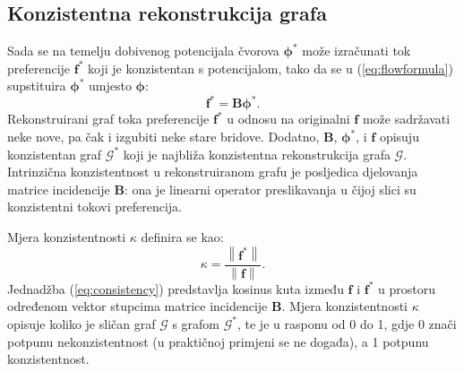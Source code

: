 \documentclass[lmodern, utf8, diplomski, numeric]{fer}
\newcommand{\matr}[1]{\mathbold{#1}}
\newcommand{\graph}[1]{\mathcal{#1}}
\newcommand{\q}{\left}
\newcommand{\w}{\right}
\begin{document}
  \subsection{Konzistentna rekonstrukcija grafa}
  \label{sec:reconstruct}
  Sada se na temelju dobivenog potencijala čvorova $\matr{\phi^*}$ može izračunati tok preferencije $\matr{f^*}$ koji je konzistentan s potencijalom, tako da se u (\ref{eq:flowformula}) supstituira $\matr{\phi^*}$ umjesto $\matr{\phi}$:
  \begin{equation}
  \matr{f^*} = \matr{B} \matr{\phi^*}.
  \end{equation}
  Rekonstruirani graf toka preferencije $\matr{f^*}$ u odnosu na originalni $\matr{f}$ može sadržavati neke nove, pa čak i izgubiti neke stare bridove.
  Dodatno, $\matr{B}$, $\matr{\phi^*}$, i $\matr{f}$ opisuju konzistentan graf $\graph{G}^*$ koji je najbliža konzistentna rekonstrukcija grafa $\graph{G}$.
  Intrinzična konzistentnost u rekonstruiranom grafu je posljedica djelovanja matrice incidencije $\matr B$: ona je linearni operator preslikavanja u čijoj slici su konzistentni tokovi preferencija.
  
  Mjera konzistentnosti $\kappa$ definira se kao:
  \begin{equation}
  \label{eq:consistency}
  \kappa = \frac{\q \lVert \matr{f^*} \w \rVert}{\q \lVert \matr{f} \w \rVert}.
  \end{equation}
  Jednadžba (\ref{eq:consistency}) predstavlja kosinus kuta između $\matr{f}$ i $\matr{f^*}$ u prostoru određenom vektor stupcima matrice incidencije $\matr{B}$.
  Mjera konzistentnosti $\kappa$ opisuje koliko je sličan graf $\graph{G}$ s grafom $\graph{G}^*$, te je u rasponu od 0 do 1, gdje 0 znači potpunu nekonzistentnost (u praktičnoj primjeni se ne događa), a 1 potpunu konzistentnost.
  
\end{document}
